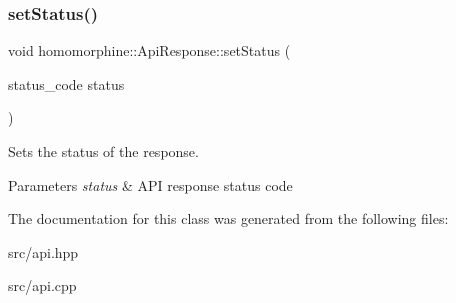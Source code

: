\subsubsection{\texorpdfstring{setStatus()}{setStatus()}}
{\footnotesize\ttfamily void homomorphine\+::\+Api\+Response\+::set\+Status (\begin{DoxyParamCaption}\item[{status\+\_\+code}]{status }\end{DoxyParamCaption})}

Sets the status of the response.


\begin{DoxyParams}{Parameters}
{\em status} & A\+PI response status code \\
\hline
\end{DoxyParams}


The documentation for this class was generated from the following files\+:\begin{DoxyCompactItemize}
\item 
src/api.\+hpp\item 
src/api.\+cpp\end{DoxyCompactItemize}
